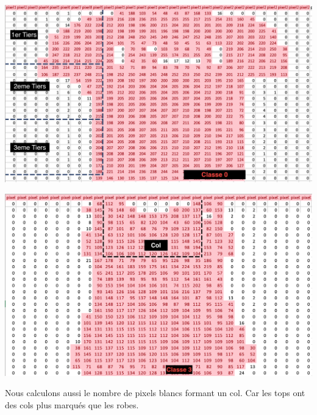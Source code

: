 \documentclass[a4paper,10pt]{article}
\begin{document}
		\begin{minipage}{0.4\linewidth}
			\includegraphics[scale = 0.15]{fichiers/decoupe_tshirt.png}		
		\end{minipage}\hfill

		\begin{minipage}{0.4\linewidth}
			\includegraphics[scale = 0.15]{fichiers/ex_robe.PNG}		
		\end{minipage}\hfill
		\begin{minipage}{0.55\linewidth}
			Nous calculons aussi le nombre de pixels blancs formant un col. Car les tops ont des cols plus marqués que les robes.\\
		\end{minipage}
\end{document}
